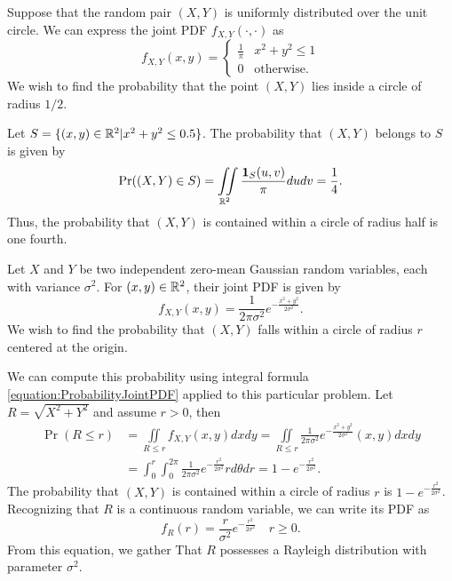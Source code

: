 \begin{example}
Suppose that the random pair $(X, Y)$ is uniformly distributed over the unit circle.
We can express the joint PDF $f_{X,Y} (\cdot, \cdot)$ as
\begin{equation*}
f_{X,Y} (x, y) = \begin{cases} \frac{1}{\pi} & x^2 + y^2 \leq 1 \\
0 & \text{otherwise} . \end{cases}
\end{equation*}
We wish to find the probability that the point $(X, Y)$ lies inside a circle of radius $1/2$.

Let $S = \{ (x, y) \in \mathbb{R}^2 | x^2 + y^2 \leq 0.5 \}$.
The probability that $(X, Y)$ belongs to $S$ is given by
\begin{equation*}
\Pr ((X,Y) \in S)
= \iint\limits_{\mathbb{R}^2}
\frac{ \mathbf{1}_{S}(u, v) }{\pi} du dv
= \frac{1}{4} .
\end{equation*}
Thus, the probability that $(X,Y)$ is contained within a circle of radius half is one fourth.
\end{example}

\begin{example}
Let $X$ and $Y$ be two independent zero-mean Gaussian random variables, each with variance $\sigma^2$.
For $(x, y) \in \mathbb{R}^2$, their joint PDF is given by
\begin{equation*}
f_{X,Y} (x,y) = \frac{1}{2 \pi \sigma^2} e^{- \frac{ x^2 + y^2 }{2 \sigma^2} } .
\end{equation*}
We wish to find the probability that $(X,Y)$ falls within a circle of radius $r$ centered at the origin.

We can compute this probability using integral formula \eqref{equation:ProbabilityJointPDF} applied to this particular problem.
Let $R = \sqrt{X^2 + Y^2}$ and assume $r > 0$, then
\begin{equation*}
\begin{split}
\Pr (R \leq r) &= \iint\limits_{R \leq r} f_{X,Y} (x,y) dx dy
= \iint\limits_{R \leq r} \frac{1}{2 \pi \sigma^2}
e^{- \frac{ x^2 + y^2 }{2 \sigma^2} } (x,y) dx dy \\
&= \int_0^r \int_0^{2\pi} \frac{1}{2 \pi \sigma^2}
e^{- \frac{ r^2 }{2 \sigma^2} } r d\theta dr
= 1 - e^{- \frac{ r^2 }{2 \sigma^2} } .
\end{split}
\end{equation*}
The probability that $(X, Y)$ is contained within a circle of radius $r$ is $1 - e^{- \frac{ r^2 }{2 \sigma^2} }$.
Recognizing that $R$ is a continuous random variable, we can write its PDF as
\begin{equation*}
f_R (r) = \frac{r}{\sigma^2} e^{- \frac{r^2}{2 \sigma^2} } \quad r \geq 0 .
\end{equation*}
From this equation, we gather That $R$ possesses a Rayleigh distribution with parameter $\sigma^2$.
\end{example}


